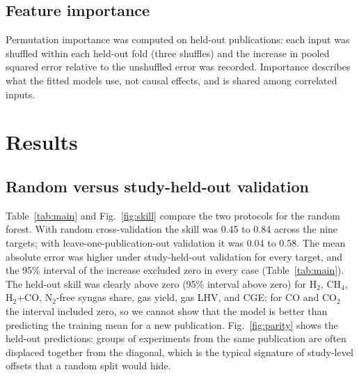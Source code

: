 \documentclass[11pt,a4paper]{article}
\begin{document}
\subsection{Feature importance}
Permutation importance was computed on held-out publications: each input was shuffled within each held-out fold (three shuffles) and the increase in pooled squared error relative to the unshuffled error was recorded. Importance describes what the fitted models use, not causal effects, and is shared among correlated inputs.

\section{Results}
\subsection{Random versus study-held-out validation}
Table~\ref{tab:main} and Fig.~\ref{fig:skill} compare the two protocols for the random forest. With random cross-validation the skill was 0.45 to 0.84 across the nine targets; with leave-one-publication-out validation it was 0.04 to 0.58. The mean absolute error was higher under study-held-out validation for every target, and the 95\% interval of the increase excluded zero in every case (Table~\ref{tab:main}). The held-out skill was clearly above zero (95\% interval above zero) for H$_2$, CH$_4$, H$_2$+CO, N$_2$-free syngas share, gas yield, gas LHV, and CGE; for CO and CO$_2$ the interval included zero, so we cannot show that the model is better than predicting the training mean for a new publication. Fig.~\ref{fig:parity} shows the held-out predictions: groups of experiments from the same publication are often displaced together from the diagonal, which is the typical signature of study-level offsets that a random split would hide.
\end{document}
